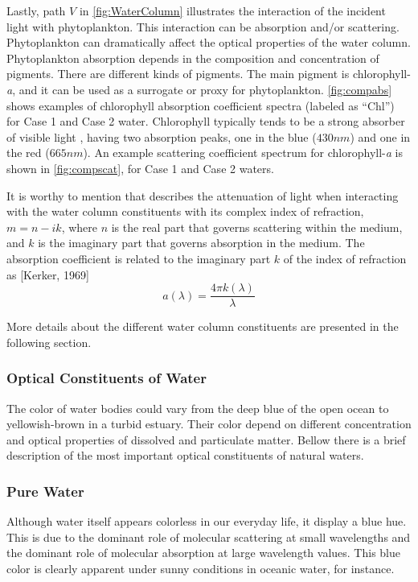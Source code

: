 Lastly, path $V$ in \autoref{fig:WaterColumn} illustrates the interaction of the incident light with phytoplankton. This interaction can be absorption and/or scattering. Phytoplankton can dramatically affect the optical properties of the water column. Phytoplankton absorption depends in the composition and concentration of pigments. There are different kinds of pigments. The main pigment is chlorophyll-{\it a}, and it can be used as a surrogate or proxy for phytoplankton. \autoref{fig:compabs} shows examples of chlorophyll absorption coefficient spectra (labeled as ``Chl'') for Case 1 and Case 2 water. Chlorophyll typically tends to be a strong absorber of visible light \cite{Mobley1994}, having two absorption peaks, one in the blue ($430nm$) and one in the red ($665nm$). An example scattering coefficient spectrum for chlorophyll-{\it a} is shown in \autoref{fig:compscat}, for Case 1 and Case 2 waters.

It is worthy to mention that \cite{Mobley1994} describes the attenuation of light when interacting with the water column constituents with its complex index of refraction, $m=n-ik$, where $n$ is the real part that governs scattering within the medium, and $k$ is the imaginary part that governs absorption in the medium. The absorption coefficient is related to the imaginary part $k$ of the index of refraction as [Kerker, 1969]
\begin{equation}
  a(\lambda)=\frac{4\pi k(\lambda)}{\lambda}
\end{equation}

More details about the different water column constituents are presented in the following section.

\subsubsection{Optical Constituents of Water}
The color of water bodies could vary from the deep blue of the open ocean to yellowish-brown in a turbid estuary. Their color depend on different concentration and optical properties of dissolved and particulate matter. Bellow there is a brief description of the most important optical constituents of natural waters.
\subsubsection*{Pure Water}
 Although water itself appears colorless in our everyday life, it display a blue hue. This is due to the dominant role of molecular scattering at small wavelengths and the dominant role of molecular absorption at large wavelength values. This blue color is clearly apparent under sunny conditions in oceanic water, for instance.

